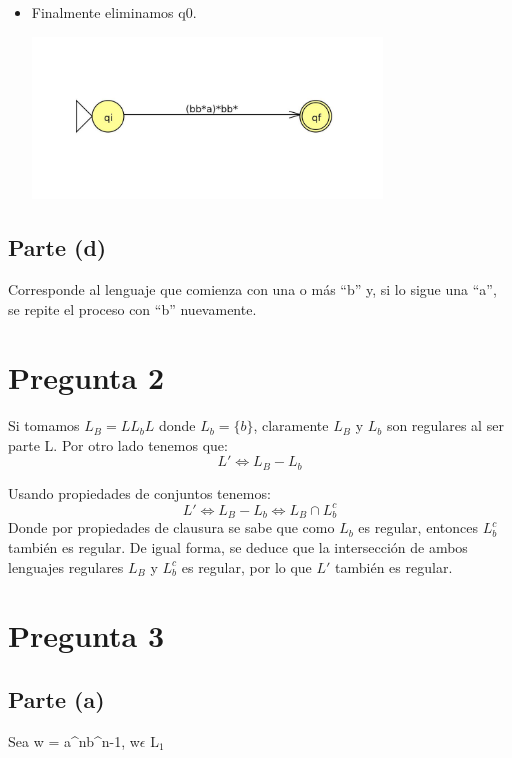 \documentclass[11pt,letterpaper]{article}
\begin{document}
\begin{itemize}
\begin{center}
\end{center}
\item{Finalmente eliminamos q0.}
\begin{center}
\includegraphics[height=4.3cm]{tarea1-c4.png}
\end{center}
\end{itemize}

\subsection{Parte (d)}
Corresponde al lenguaje que comienza con una o más ``b'' y, si lo sigue una ``a'', se repite el proceso con ``b'' nuevamente.

\section{Pregunta 2}
Si tomamos $L_B = LL_bL$ \hspace{0.1cm} donde $L_b = \{b\}$, claramente $L_B$ y $L_b$ son regulares al ser parte L. Por otro lado tenemos que: 
\begin{equation}
	L' \Leftrightarrow L_B - L_b
\end{equation}

Usando propiedades de conjuntos tenemos:
\begin{equation}
	L' \Leftrightarrow L_B - L_b \Leftrightarrow  L_B \cap L_b^c
\end{equation}
Donde por propiedades de clausura se sabe que como $L_b$ es regular, entonces $L_b^c$ también es regular. De igual forma, se deduce que la intersección de ambos lenguajes regulares $L_B$ y $L_b^c$ es regular, por lo que $L'$ también es regular.


\section{Pregunta 3}
\subsection{Parte (a)}
Sea w = a^nb^{n-1}, w$ \epsilon $ L$_{1}$
\end{document}
